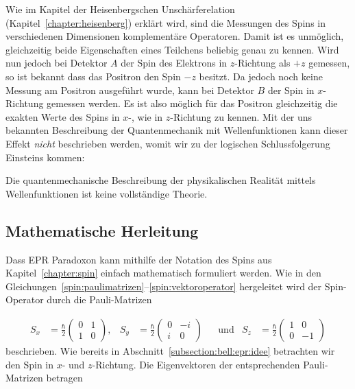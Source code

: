 \begin{refsection}
Wie im Kapitel der Heisenbergschen Unsch\"arferelation 
(Kapitel~\ref{chapter:heisenberg})
erkl\"art wird, sind die Messungen des Spins in verschiedenen Dimensionen 
komplement\"are Operatoren.
Damit ist es unm\"oglich, gleichzeitig beide Eigenschaften eines Teilchens
beliebig genau zu kennen.
Wird nun jedoch bei Detektor $A$ der Spin des Elektrons in $z$-Richtung 
als $+z$ gemessen, so ist bekannt dass das Positron den Spin $-z$ besitzt.
Da jedoch noch keine Messung am Positron ausgef\"uhrt wurde, kann bei
Detektor $B$ der Spin in $x$-Richtung gemessen werden.
Es ist also m\"oglich f\"ur das Positron gleichzeitig die exakten Werte 
des Spins in $x$-, wie in $z$-Richtung zu kennen. 
Mit der uns bekannten Beschreibung der Quantenmechanik mit Wellenfunktionen
kann dieser Effekt \emph{nicht} beschrieben werden, womit wir zu der
logischen Schlussfolgerung Einsteins kommen:

\begin{satz}
    Die quantenmechanische Beschreibung der physikalischen Realit\"at mittels
    Wellenfunktionen ist keine vollst\"andige Theorie.
\end{satz}

\subsection{Mathematische Herleitung\label{subsection:bell:epr:herleitung}}
Dass EPR Paradoxon kann mithilfe der Notation des Spins aus 
Kapitel~\ref{chapter:spin}  einfach mathematisch formuliert werden.
Wie in den Gleichungen~\ref{spin:paulimatrizen}--\ref{spin:vektoroperator}
hergeleitet wird der Spin-Operator durch die Pauli-Matrizen

\begin{align}
    S_x &= \frac{\hbar}{2} \begin{pmatrix}
    0 & 1 \\ 1 & 0
    \end{pmatrix},
    &
    S_y &= \frac{\hbar}{2} \begin{pmatrix}
    0 & -i \\ i & 0
    \end{pmatrix}
    &&\text{und}
    &
    S_z &= \frac{\hbar}{2} \begin{pmatrix}
    1 & 0 \\ 0 & -1
    \end{pmatrix}\label{equ:bell:paulimatrizen}
\end{align}
beschrieben.
Wie bereits in Abschnitt~\ref{subsection:bell:epr:idee} betrachten 
wir den Spin in $x$- und $z$-Richtung.
Die Eigenvektoren der entsprechenden Pauli-Matrizen betragen


\end{refsection}
